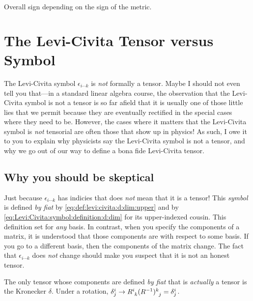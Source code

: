 \documentclass[12pt, oneside]{report}    %
\let\oldsection\section
\def\section{%
  \setcounter{sidenote}{1}%
  \oldsection
}
\begin{document}
\begin{subappendices}
Overall sign depending on the sign of the metric. 


\section{The Levi-Civita Tensor versus Symbol}
\label{sec:Levi:Civita:Tensor:vs:Symbol}

The Levi-Civita symbol $\epsilon_{i\cdots k}$ is \emph{not} formally a tensor. Maybe I should not even tell you that---in a standard linear algebra course, the observation that the Levi-Civita symbol is not a tensor is so far afield that it is usually one of those little lies that we permit because they are eventually rectified in the special cases where they need to be. However, the cases where it matters that the Levi-Civita symbol is \emph{not} tensorial are often those that show up in physics! As such, I owe it to you to explain why physicists say the Levi-Civita symbol is not a tensor, and why we go out of our way to define a bona fide Levi-Civita tensor.

\subsection{Why you should be skeptical} 

Just because $\epsilon_{i\cdots k}$ has indicies that does \emph{not} mean that it is a tensor! This \emph{symbol} is defined \emph{by fiat} by \eqref{eq:def:levi:civita:d:dim:upper} and by \eqref{eq:Levi:Civita:symbol:definition:d:dim} for its upper-indexed cousin. This definition set for \emph{any} basis. In contrast, when you specify the components of a matrix, it is understood that those components are with respect to some basis. If you go to a different basis, then the components of the matrix change. The fact that $\epsilon_{i\cdots k}$ does \emph{not} change should make you suspect that it is not an honest tensor.
\begin{example}
The only tensor whose components are defined \emph{by fiat} that is \emph{actually} a tensor is the Kronecker $\delta$. Under a rotation, $\delta^i_j \to R\aij{i}{k}(R\inv)\aij{k}{j} = \delta^i_j$.
\end{example}


\end{subappendices}
\end{document}
